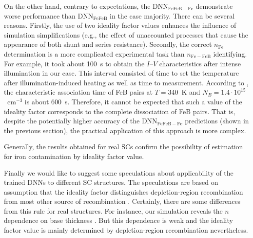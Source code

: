 \documentclass[num-refs]{wiley-article} %
\begin{document}
On the other hand, contrary to expectations, the DNN$_\mathrm{FeFeB-Fe}$ demonstrate worse performance than DNN$_\mathrm{FeFeB}$ in the case majority.
There can be several reasons.
Firstly, the use of two ideality factor values enhances the influence of simulation simplifications (e.g., the effect of unaccounted processes that cause the appearance of both shunt and series resistance).
Secondly, the correct $n_\mathrm{Fe}$ determination is a more complicated experimental task than $n_\mathrm{Fe-FeB}$ identifying.
For example, it took about 100~s to obtain the $I$--$V$ characteristics
after intense illumination in our case.
This interval consisted of time to set the temperature after
illumination-induced heating
as well as time to measurement.
According to \cite{FeBAssJAP2014,FeBKin2019}, the characteristic association time of FeB pairs
at $T=340$~K and $N_B=1.4\cdot10^{15}$~cm$^{-3}$ is about 600~s.
Therefore, it cannot be expected that such a value of the ideality factor
corresponds to the complete dissociation of FeB pairs.
That is, despite the potentially higher accuracy of the DNN$_\mathrm{FeFeB-Fe}$ predictions
(shown in the previous section), the practical application of this approach is more complex.

Generally, the results obtained for real SCs confirm the possibility of estimation for iron contamination by ideality factor value.

Finally we would like to suggest some speculations about applicability of the trained DNNs to different SC structures.
The speculations are based on assumption that the ideality factor distinguishes
depletion-region recombination from most other source of recombination \cite{Breitenstein2013,n2McIntosh}.
Certainly, there are some differences from this rule for real structures.
For instance, our simulation reveals the $n$ dependence on base thickness \cite{OlikhJPS}.
But this dependence is weak and the ideality factor value is mainly determined
by depletion-region recombination nevertheless.
\end{document}
